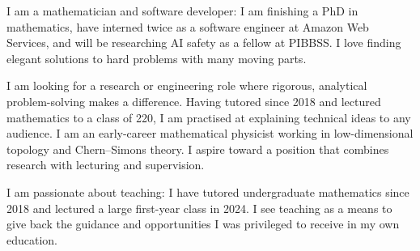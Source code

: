 
\ifindustry %
	I am a mathematician and software developer: I am finishing a PhD in mathematics, have interned
	twice as a software engineer at Amazon Web Services, and will be researching AI safety as a
	fellow at PIBBSS. I love finding elegant solutions to hard problems with many moving parts.

	\medskip

	I am looking for a research or engineering role where rigorous, analytical problem-solving makes
	a difference. Having tutored since 2018 and lectured mathematics to a class of 220, I am
	practised at explaining technical ideas to any audience.
\else %
	I am an early-career mathematical physicist working in low-dimensional topology and
	Chern--Simons theory. I aspire toward a position that combines research with lecturing and
	supervision.

	\medskip

	I am passionate about teaching: I have tutored undergraduate mathematics since 2018 and lectured
	a large first-year class in 2024. I see teaching as a means to give back the guidance and
	opportunities I was privileged to receive in my own education.
\fi %
